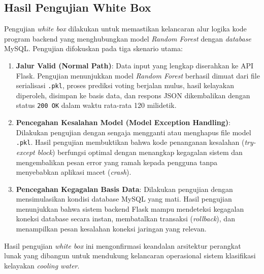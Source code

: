 \subsection{Hasil Pengujian White Box}
Pengujian \textit{white box} dilakukan untuk memastikan kelancaran alur logika kode program backend yang menghubungkan model \textit{Random Forest} dengan \textit{database} MySQL. Pengujian difokuskan pada tiga skenario utama:
\begin{enumerate}
    \item \textbf{Jalur Valid (Normal Path)}: Data input yang lengkap diserahkan ke API Flask. Pengujian menunjukkan model \textit{Random Forest} berhasil dimuat dari file serialisasi \texttt{.pkl}, proses prediksi voting berjalan mulus, hasil kelayakan diperoleh, disimpan ke basis data, dan respons JSON dikembalikan dengan status \texttt{200 OK} dalam waktu rata-rata 120 milidetik.
    \item \textbf{Pencegahan Kesalahan Model (Model Exception Handling)}: Dilakukan pengujian dengan sengaja mengganti atau menghapus file model \texttt{.pkl}. Hasil pengujian membuktikan bahwa kode penanganan kesalahan (\textit{try-except block}) berfungsi optimal dengan menangkap kegagalan sistem dan mengembalikan pesan error yang ramah kepada pengguna tanpa menyebabkan aplikasi macet (\textit{crash}).
    \item \textbf{Pencegahan Kegagalan Basis Data}: Dilakukan pengujian dengan mensimulasikan kondisi database MySQL yang mati. Hasil pengujian menunjukkan bahwa sistem backend Flask mampu mendeteksi kegagalan koneksi database secara instan, membatalkan transaksi (\textit{rollback}), dan menampilkan pesan kesalahan koneksi jaringan yang relevan.
\end{enumerate}
Hasil pengujian \textit{white box} ini mengonfirmasi keandalan arsitektur perangkat lunak yang dibangun untuk mendukung kelancaran operasional sistem klasifikasi kelayakan \textit{cooling water}.
